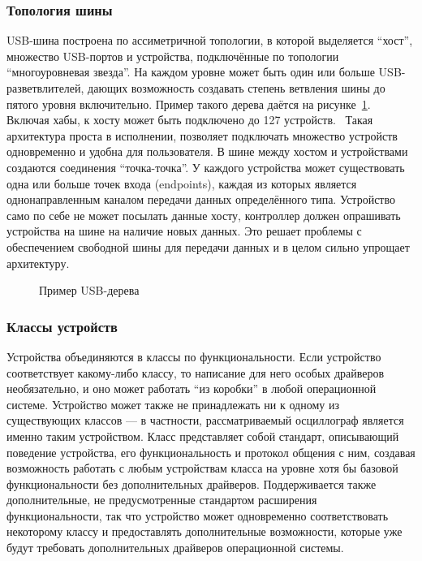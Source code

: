 \documentclass[a4paper,12pt]{report}
\numberwithin{equation}{section}
\begin{document}
\subsubsection{Топология шины}
USB-шина построена по ассиметричной топологии, в которой выделяется ``хост'',
множество USB-портов и устройства, подключённые по топологии ``многоуровневая
звезда''. На каждом уровне может быть один или больше USB-разветвлителей, дающих
возможность создавать степень ветвления шины до пятого уровня включительно.
Пример такого дерева даётся на рисунке~\ref{sampleusbtree}. Включая хабы, к
хосту может быть подключено до 127 устройств.~\cite{usb20} Такая архитектура
проста в исполнении, позволяет подключать множество устройств одновременно и
удобна для пользователя. В шине между хостом и устройствами создаются соединения
``точка-точка''. У каждого устройства может существовать одна или больше точек
входа (endpoints), каждая из которых является однонаправленным каналом передачи
данных определённого типа. Устройство само по себе не может посылать данные
хосту, контроллер должен опрашивать устройства на шине на наличие новых
данных. Это решает проблемы с обеспечением свободной шины для передачи данных и
в целом сильно упрощает архитектуру.

\begin{figure}[h!]
\centering
{}
\caption{Пример USB-дерева}
\label{sampleusbtree}
\end{figure}

\subsubsection{Классы устройств}
Устройства объединяются в классы по функциональности. Если устройство
соответствует какому-либо классу, то написание для него особых драйверов
необязательно, и оно может работать ``из коробки'' в любой операционной
системе. Устройство может также не принадлежать ни к одному из существующих
классов --- в частности, рассматриваемый осциллограф является именно таким
устройством. Класс представляет собой стандарт, описывающий поведение
устройства, его функциональность и протокол общения с ним, создавая возможность
работать с любым устройствам класса на уровне хотя бы базовой функциональности
без дополнительных драйверов. Поддерживается также дополнительные, не
предусмотренные стандартом расширения функциональности, так что устройство может
одновременно соответствовать некоторому классу и предоставлять дополнительные
возможности, которые уже будут требовать дополнительных драйверов операционной
системы.
\end{document}
